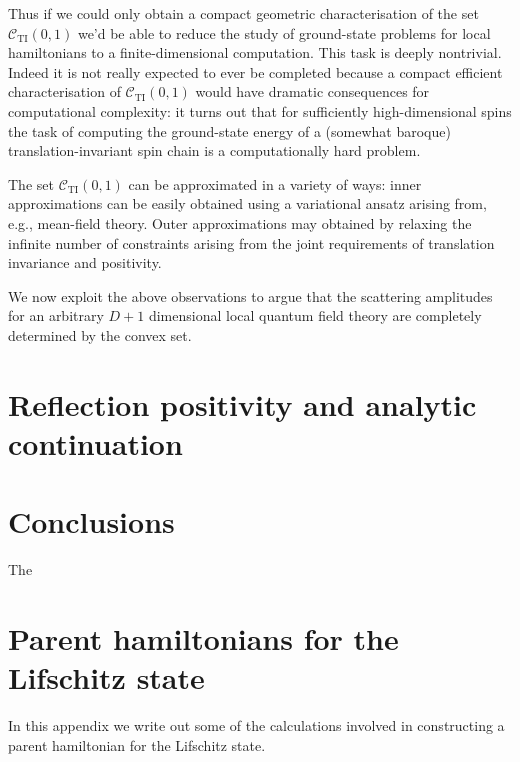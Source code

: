 \documentclass[twocolumn,lengthcheck,superscriptaddress]{revtex4-1}
\theoremstyle{definition}
\theoremstyle{remark}
\begin{document}
Thus if we could only obtain a compact geometric characterisation of the set $\mathcal{C}_{\text{TI}}(0,1)$ we'd be able to reduce the study of ground-state problems for local hamiltonians to a finite-dimensional computation. This task is deeply nontrivial. Indeed it is not really expected to ever be completed because a compact efficient characterisation of $\mathcal{C}_{\text{TI}}(0,1)$ would have dramatic consequences for computational complexity: it turns out that for sufficiently high-dimensional spins the task of computing the ground-state energy of a (somewhat baroque) translation-invariant spin chain is a computationally hard problem. 

The set $\mathcal{C}_{\text{TI}}(0,1)$ can be approximated in a variety of ways: inner approximations can be easily obtained using a variational ansatz arising from, e.g., mean-field theory. Outer approximations may obtained by relaxing the infinite number of constraints arising from the joint requirements of translation invariance and positivity. 

We now exploit the above observations to argue that the scattering amplitudes for an arbitrary $D+1$ dimensional local quantum field theory are completely determined by the convex set. 

\section{Reflection positivity and analytic continuation}

\section{Conclusions}
The



\widetext
\appendix
\section{Parent hamiltonians for the Lifschitz state}\label{app:metro}
In this appendix we write out some of the calculations involved in constructing a parent hamiltonian for the Lifschitz state.
\end{document}
